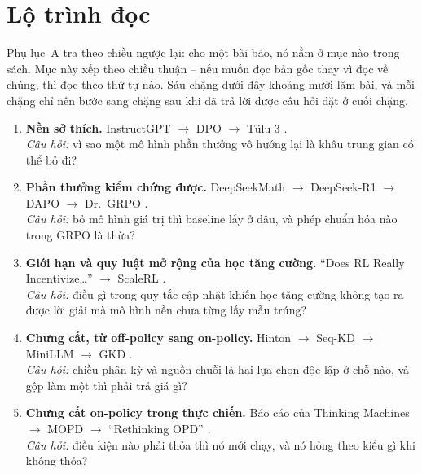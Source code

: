 
\section{Lộ trình đọc}
\label{sec:post_training_reading_map}

Phụ lục~A tra theo chiều ngược lại: cho một bài báo, nó nằm ở mục nào trong sách. Mục này xếp theo chiều thuận -- nếu muốn đọc bản gốc thay vì đọc về chúng, thì đọc theo thứ tự nào. Sáu chặng dưới đây khoảng mười lăm bài, và mỗi chặng chỉ nên bước sang chặng sau khi đã trả lời được câu hỏi đặt ở cuối chặng.

\begin{enumerate}
	\item \textbf{Nền sở thích.} InstructGPT \cite{ouyang2022training} $\rightarrow$ DPO \cite{rafailov2023direct} $\rightarrow$ Tülu 3 \cite{lambert2024tulu3}.\\
	\emph{Câu hỏi:} vì sao một mô hình phần thưởng vô hướng lại là khâu trung gian có thể bỏ đi?

	\item \textbf{Phần thưởng kiểm chứng được.} DeepSeekMath \cite{shao2024deepseekmath} $\rightarrow$ DeepSeek-R1 \cite{deepseekai2025r1} $\rightarrow$ DAPO \cite{yu2025dapo} $\rightarrow$ Dr.~GRPO \cite{liu2025drgrpo}.\\
	\emph{Câu hỏi:} bỏ mô hình giá trị thì baseline lấy ở đâu, và phép chuẩn hóa nào trong GRPO là thừa?

	\item \textbf{Giới hạn và quy luật mở rộng của học tăng cường.} ``Does RL Really Incentivize\ldots'' \cite{yue2025rlboundary} $\rightarrow$ ScaleRL \cite{khatri2025scalerl}.\\
	\emph{Câu hỏi:} điều gì trong quy tắc cập nhật khiến học tăng cường không tạo ra được lời giải mà mô hình nền chưa từng lấy mẫu trúng?

	\item \textbf{Chưng cất, từ off-policy sang on-policy.} Hinton \cite{hinton2015distilling} $\rightarrow$ Seq-KD \cite{kim2016sequence} $\rightarrow$ MiniLLM \cite{gu2024minillm} $\rightarrow$ GKD \cite{agarwal2024gkd}.\\
	\emph{Câu hỏi:} chiều phân kỳ và nguồn chuỗi là hai lựa chọn độc lập ở chỗ nào, và gộp làm một thì phải trả giá gì?

	\item \textbf{Chưng cất on-policy trong thực chiến.} Báo cáo của Thinking Machines \cite{lu2025opd} $\rightarrow$ MOPD \cite{ma2026mopd} $\rightarrow$ ``Rethinking OPD'' \cite{li2026rethinkingopd}.\\
	\emph{Câu hỏi:} điều kiện nào phải thỏa thì nó mới chạy, và nó hỏng theo kiểu gì khi không thỏa?


\end{enumerate}
